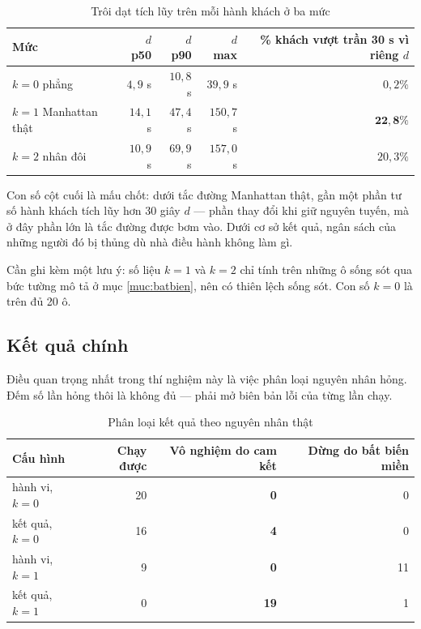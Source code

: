 \begin{table}[htbp]
\centering
\caption{Trôi dạt tích lũy trên mỗi hành khách ở ba mức}
\label{bang:troidat}
\small
\begin{tabular}{@{}lrrrr@{}}
\toprule
\textbf{Mức} & $d$ \textbf{p50} & $d$ \textbf{p90} & $d$ \textbf{max} & \textbf{\% khách vượt trần 30 s vì riêng $d$}\\
\midrule
$k=0$ phẳng & $4{,}9$ s & $10{,}8$ s & $39{,}9$ s & $0{,}2\%$\\
$k=1$ Manhattan thật & $14{,}1$ s & $47{,}4$ s & $150{,}7$ s & $\mathbf{22{,}8\%}$\\
$k=2$ nhân đôi & $10{,}9$ s & $69{,}9$ s & $157{,}0$ s & $20{,}3\%$\\
\bottomrule
\end{tabular}
\end{table}

Con số cột cuối là mấu chốt: dưới tắc đường Manhattan thật, gần một phần tư số hành khách tích
lũy hơn 30 giây $d$ --- phần thay đổi khi giữ nguyên tuyến, mà ở đây phần lớn là tắc đường được bơm
vào. Dưới cơ sở kết quả, ngân sách của những người đó bị thủng dù nhà điều hành không làm gì.

Cần ghi kèm một lưu ý: số liệu $k=1$ và $k=2$ chỉ tính trên những ô sống sót qua bức tường mô tả
ở mục \ref{muc:batbien}, nên có thiên lệch sống sót. Con số $k=0$ là trên đủ 20 ô.

\subsection{Kết quả chính}

Điều quan trọng nhất trong thí nghiệm này là việc phân loại nguyên nhân hỏng. Đếm số lần hỏng
thôi là không đủ --- phải mở biên bản lỗi của từng lần chạy.

\begin{table}[htbp]
\centering
\caption{Phân loại kết quả theo nguyên nhân thật}
\label{bang:phanloai}
\small
\begin{tabular}{@{}lrrr@{}}
\toprule
\textbf{Cấu hình} & \textbf{Chạy được} & \textbf{Vô nghiệm do cam kết} & \textbf{Dừng do bất biến miền}\\
\midrule
hành vi, $k=0$ & 20 & \textbf{0} & 0\\
kết quả, $k=0$ & 16 & \textbf{4} & 0\\
hành vi, $k=1$ & 9 & \textbf{0} & 11\\
kết quả, $k=1$ & 0 & \textbf{19} & 1\\
\bottomrule
\end{tabular}
\end{table}

